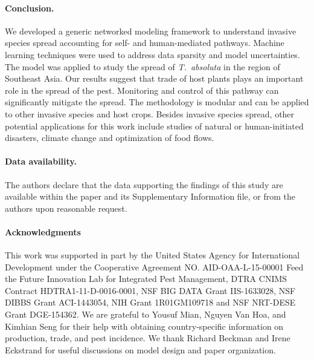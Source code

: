 \documentclass[11pt]{article}
\newcommand{\tuta}{\emph{T.~absoluta}}
\theoremstyle{definition}
\begin{document}
\paragraph{Conclusion.} We developed a generic networked modeling framework
to understand invasive species spread accounting for self- and
human-mediated pathways. Machine learning techniques were used to address
data sparsity and model uncertainties. The model was applied to study the
spread of \tuta{} in the region of Southeast Asia. Our results suggest that
trade of host plants plays an important role in the spread of the pest.
Monitoring and control of this pathway can significantly mitigate the
spread. The methodology is modular and can be applied to
other invasive species and host crops. Besides invasive species spread,
other potential applications for this work include studies of natural or
human-initiated disasters, climate change and optimization of food flows.

\paragraph{Data availability.} The authors declare that the data supporting the
findings of this study are available within the paper and its Supplementary
Information file, or from the authors upon reasonable request.

\paragraph{Acknowledgments}
This work was supported in part by the United States Agency for
International Development under the Cooperative Agreement NO.
AID-OAA-L-15-00001 Feed the Future Innovation Lab for Integrated Pest
Management, DTRA CNIMS Contract HDTRA1-11-D-0016-0001, NSF BIG DATA Grant
IIS-1633028, NSF DIBBS Grant ACI-1443054, NIH Grant 1R01GM109718 and NSF
NRT-DESE Grant DGE-154362.  We are grateful to Yousuf Mian, Nguyen Van Hoa,
and Kimhian Seng for their help with obtaining country-specific information
on production, trade, and pest incidence. We thank Richard Beckman and
Irene Eckstrand for useful discussions on model design and paper
organization.
\end{document}
